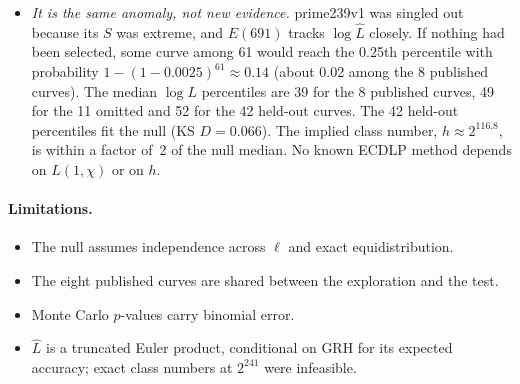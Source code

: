 \documentclass[11pt,a4paper]{article}
\theoremstyle{plain}
\newcommand{\Lhat}{\hat{L}}
\begin{document}
\begin{itemize}
  $10^{-3}$; this is not a proved bound. For prime239v1, $\Lhat = 0.246$, at
  the 0.25th percentile of the prime-order null and the lowest of the 61
  curves. Its partial log-Euler product is $-0.998$ over
  $3 \le \ell \le 691$ and only $+0.002$ over $\ell > 691$, so the first 124
  odd primes carry essentially all of it. $E(B)$ stays between the 0.22nd and
  0.25th percentile for $691 \le B \le 5003$. An independent study with
  separate code and a frozen protocol record
  () reproduces it: on the 61 shared
  curves $\log \Lhat$ at $x = 10^6$ agrees to $3 \times 10^{-14}$, and
  prime239v1 is again at the 0.25th percentile and the lowest
  ( there). Over the same range, the split-count
  percentile rises from 0.06 to 11 (Section~\ref{sec:explore}). That rise is
  an artefact of the unweighted count, not a sign of an ordinary $L$-value.
\item \emph{It is the same anomaly, not new evidence.} prime239v1 was singled
  out because its $S$ was extreme, and $E(691)$ tracks $\log \Lhat$ closely.
  If nothing had been selected, some curve among 61 would reach the 0.25th
  percentile with probability $1 - (1 - 0.0025)^{61} \approx 0.14$ (about
  0.02 among the 8 published curves). The median $\log L$ percentiles are 39
  for the 8 published curves, 49 for the 11 omitted and 52 for the 42
  held-out curves. The 42 held-out percentiles fit the null (KS $D = 0.066$).
  The implied class number, $h \approx 2^{116.8}$, is within a factor of~2 of
  the null median. No known ECDLP method depends on $L(1,\chi)$ or on $h$.
\end{itemize}

\paragraph{Limitations.}
\begin{itemize}
\item The null assumes independence across $\ell$ and exact equidistribution.
\item The eight published curves are shared between the exploration and the
  test.
\item Monte Carlo $p$-values carry binomial error.
\item $\Lhat$ is a truncated Euler product, conditional on GRH for its
  expected accuracy; exact class numbers at $2^{241}$ were infeasible.
\end{itemize}



\end{document}
